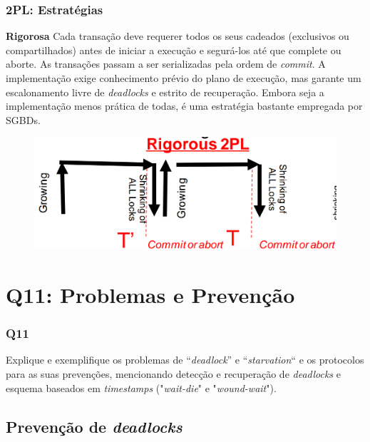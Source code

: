 \documentclass{beamer}
\begin{document}
\begin{frame} %
    \frametitle{2PL: Estratégias}
    \begin{block}{\textbf{Rigorosa}}
        Cada transação deve requerer todos os seus cadeados (exclusivos ou compartilhados) antes de iniciar a execução e segurá-los até que complete ou aborte. As transações passam a ser serializadas pela ordem de \emph{commit}. A implementação exige conhecimento prévio do plano de execução, mas garante um escalonamento livre de \emph{deadlocks} e estrito de recuperação. Embora seja a implementação menos prática de todas, é uma estratégia bastante empregada por SGBDs.

        \medskip
        \begin{figure}
            \includegraphics[width=0.65\linewidth]{rigorous2pl.png}
        \end{figure}
    \end{block}
\end{frame}

\section{Q11: Problemas e Prevenção}



\begin{frame}
    \frametitle{Q11}

    Explique e exemplifique os problemas de “\emph{deadlock}” e “\emph{starvation}“
    e os protocolos para as suas prevenções, mencionando detecção
    e recuperação de \emph{deadlocks} e esquema baseados em \emph{timestamps}
    ("\emph{wait-die}" e "\emph{wound-wait}").

\end{frame}

\subsection{Prevenção de \emph{deadlocks}}
\end{document}
